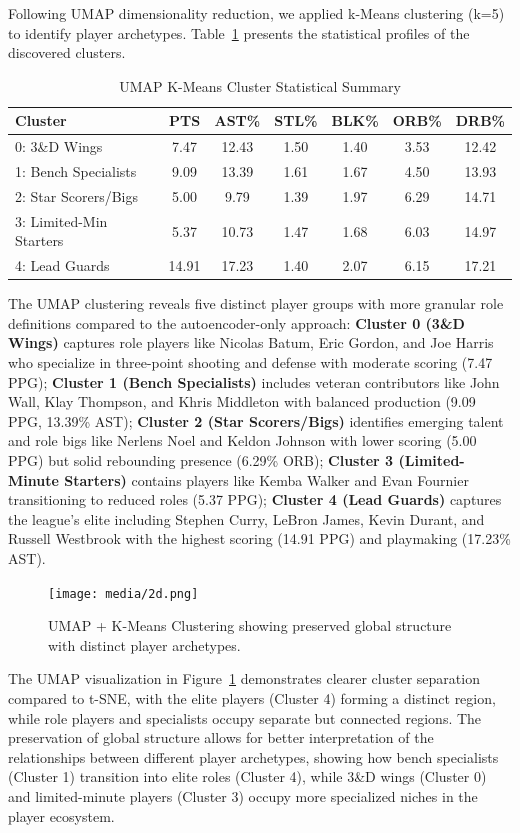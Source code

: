 \documentclass{article}
\begin{document}
Following UMAP dimensionality reduction, we applied k-Means clustering (k=5) to identify player archetypes. Table~\ref{tab:umap_cluster_stats} presents the statistical profiles of the discovered clusters.

\begin{table}[h!]
\centering
\caption{UMAP K-Means Cluster Statistical Summary}
\label{tab:umap_cluster_stats}
\begin{tabular}{lcccccc}
\toprule
\textbf{Cluster} & \textbf{PTS} & \textbf{AST\%} & \textbf{STL\%} & \textbf{BLK\%} & \textbf{ORB\%} & \textbf{DRB\%} \\
\midrule
0: 3\&D Wings & 7.47 & 12.43 & 1.50 & 1.40 & 3.53 & 12.42 \\
1: Bench Specialists & 9.09 & 13.39 & 1.61 & 1.67 & 4.50 & 13.93 \\
2: Star Scorers/Bigs & 5.00 & 9.79 & 1.39 & 1.97 & 6.29 & 14.71 \\
3: Limited-Min Starters & 5.37 & 10.73 & 1.47 & 1.68 & 6.03 & 14.97 \\
4: Lead Guards & 14.91 & 17.23 & 1.40 & 2.07 & 6.15 & 17.21 \\
\bottomrule
\end{tabular}
\end{table}

The UMAP clustering reveals five distinct player groups with more granular role definitions compared to the autoencoder-only approach: {\bf Cluster 0 (3\&D Wings)} captures role players like Nicolas Batum, Eric Gordon, and Joe Harris who specialize in three-point shooting and defense with moderate scoring (7.47 PPG); {\bf Cluster 1 (Bench Specialists)} includes veteran contributors like John Wall, Klay Thompson, and Khris Middleton with balanced production (9.09 PPG, 13.39\% AST); {\bf Cluster 2 (Star Scorers/Bigs)} identifies emerging talent and role bigs like Nerlens Noel and Keldon Johnson with lower scoring (5.00 PPG) but solid rebounding presence (6.29\% ORB); {\bf Cluster 3 (Limited-Minute Starters)} contains players like Kemba Walker and Evan Fournier transitioning to reduced roles (5.37 PPG); {\bf Cluster 4 (Lead Guards)} captures the league's elite including Stephen Curry, LeBron James, Kevin Durant, and Russell Westbrook with the highest scoring (14.91 PPG) and playmaking (17.23\% AST).

\begin{figure}[h]
    \centering
    \texttt{[image: media/2d.png]}
    \caption{UMAP + K-Means Clustering showing preserved global structure with distinct player archetypes.}
    \label{fig:umap_clustering}
\end{figure}

The UMAP visualization in Figure~\ref{fig:umap_clustering} demonstrates clearer cluster separation compared to t-SNE, with the elite players (Cluster 4) forming a distinct region, while role players and specialists occupy separate but connected regions. The preservation of global structure allows for better interpretation of the relationships between different player archetypes, showing how bench specialists (Cluster 1) transition into elite roles (Cluster 4), while 3\&D wings (Cluster 0) and limited-minute players (Cluster 3) occupy more specialized niches in the player ecosystem.
\end{document}
